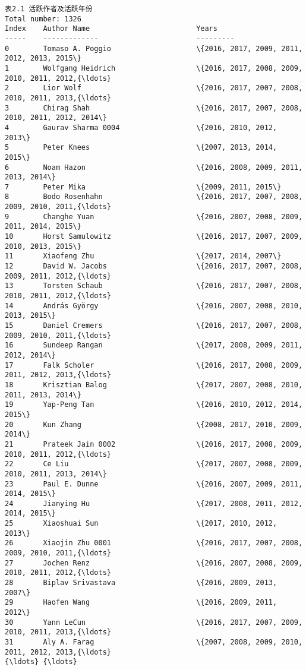 \documentclass[11pt]{article}
\begin{document}
    \begin{Verbatim}[commandchars=\\\{\}]
                                  表2.1 活跃作者及活跃年份                   
Total number: 1326
Index    Author Name                         Years     
-----    -------------                       --------- 
0        Tomaso A. Poggio                    \{2016, 2017, 2009, 2011, 2012, 2013, 2015\}
1        Wolfgang Heidrich                   \{2016, 2017, 2008, 2009, 2010, 2011, 2012,{\ldots}
2        Lior Wolf                           \{2016, 2017, 2007, 2008, 2010, 2011, 2013,{\ldots}
3        Chirag Shah                         \{2016, 2017, 2007, 2008, 2010, 2011, 2012, 2014\}
4        Gaurav Sharma 0004                  \{2016, 2010, 2012, 2013\}
5        Peter Knees                         \{2007, 2013, 2014, 2015\}
6        Noam Hazon                          \{2016, 2008, 2009, 2011, 2013, 2014\}
7        Peter Mika                          \{2009, 2011, 2015\}
8        Bodo Rosenhahn                      \{2016, 2017, 2007, 2008, 2009, 2010, 2011,{\ldots}
9        Changhe Yuan                        \{2016, 2007, 2008, 2009, 2011, 2014, 2015\}
10       Horst Samulowitz                    \{2016, 2017, 2007, 2009, 2010, 2013, 2015\}
11       Xiaofeng Zhu                        \{2017, 2014, 2007\}
12       David W. Jacobs                     \{2016, 2017, 2007, 2008, 2009, 2011, 2012,{\ldots}
13       Torsten Schaub                      \{2016, 2017, 2007, 2008, 2010, 2011, 2012,{\ldots}
14       András György                       \{2016, 2007, 2008, 2010, 2013, 2015\}
15       Daniel Cremers                      \{2016, 2017, 2007, 2008, 2009, 2010, 2011,{\ldots}
16       Sundeep Rangan                      \{2017, 2008, 2009, 2011, 2012, 2014\}
17       Falk Scholer                        \{2016, 2017, 2008, 2009, 2011, 2012, 2013,{\ldots}
18       Krisztian Balog                     \{2017, 2007, 2008, 2010, 2011, 2013, 2014\}
19       Yap-Peng Tan                        \{2016, 2010, 2012, 2014, 2015\}
20       Kun Zhang                           \{2008, 2017, 2010, 2009, 2014\}
21       Prateek Jain 0002                   \{2016, 2017, 2008, 2009, 2010, 2011, 2012,{\ldots}
22       Ce Liu                              \{2017, 2007, 2008, 2009, 2010, 2011, 2013, 2014\}
23       Paul E. Dunne                       \{2016, 2007, 2009, 2011, 2014, 2015\}
24       Jianying Hu                         \{2017, 2008, 2011, 2012, 2014, 2015\}
25       Xiaoshuai Sun                       \{2017, 2010, 2012, 2013\}
26       Xiaojin Zhu 0001                    \{2016, 2017, 2007, 2008, 2009, 2010, 2011,{\ldots}
27       Jochen Renz                         \{2016, 2007, 2008, 2009, 2010, 2011, 2012,{\ldots}
28       Biplav Srivastava                   \{2016, 2009, 2013, 2007\}
29       Haofen Wang                         \{2016, 2009, 2011, 2012\}
30       Yann LeCun                          \{2016, 2017, 2007, 2009, 2010, 2011, 2013,{\ldots}
31       Aly A. Farag                        \{2007, 2008, 2009, 2010, 2011, 2012, 2013,{\ldots}
{\ldots} {\ldots}

    \end{Verbatim}
\end{document}

